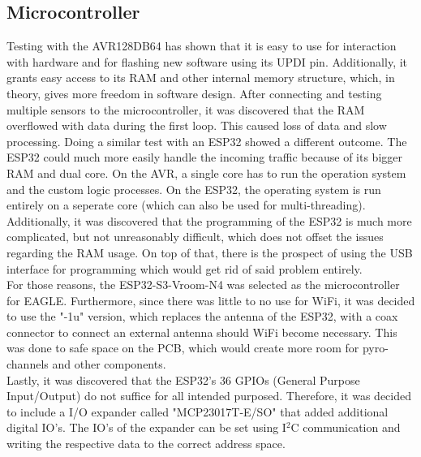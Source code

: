 \documentclass[fontsize=11pt,%
twoside,%
BCOR          = 8mm, %
DIV           = 11,  %
titlepage     = off,%
index=totoc,%
xcolor        = pdftex,%
dvipsnames,%
bibliography  = totoc,%
bibliography = numbered, %
listof        = notnumbered]{scrreprt}
\begin{document}
\subsection{Microcontroller}
Testing with the AVR128DB64 has shown that it is easy to use for interaction with hardware and for flashing new software using its UPDI pin. Additionally, it grants easy access to its RAM and other internal memory structure, which, in theory, gives more freedom in software design. After connecting and testing multiple sensors to the microcontroller, it was discovered that the RAM overflowed with data during the first loop. This caused loss of data and slow processing. Doing a similar test with an ESP32 showed a different outcome. The ESP32 could much more easily handle the incoming traffic because of its bigger RAM and dual core. On the AVR, a single core has to run the operation system and the custom logic processes. On the ESP32, the operating system is run entirely on a seperate core (which can also be used for multi-threading). Additionally, it was discovered that the programming of the ESP32 is much more complicated, but not unreasonably difficult, which does not offset the issues regarding the RAM usage. On top of that, there is the prospect of using the USB interface for programming which would get rid of said problem entirely.\\
For those reasons, the ESP32-S3-Vroom-N4 was selected as the microcontroller for EAGLE. Furthermore, since there was little to no use for WiFi, it was decided to use the "-1u" version, which replaces the antenna of the ESP32, with a coax connector to connect an external antenna should WiFi become necessary. This was done to safe space on the PCB, which would create more room for pyro-channels and other components.\\
Lastly, it was discovered that the ESP32's 36 GPIOs (General Purpose Input/Output) do not suffice for all intended purposed. Therefore, it was decided to include a I/O expander called "MCP23017T-E/SO" that added additional digital IO's. The IO's of the expander can be set using I$^2$C communication and writing the respective data to the correct address space.
\end{document}
